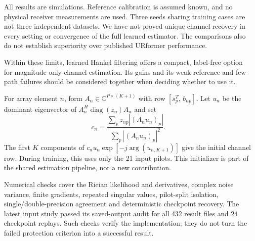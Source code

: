\documentclass[journal]{IEEEtran}
\begin{document}
All results are simulations. Reference calibration is assumed known,
and no physical receiver measurements are used. Three seeds sharing
training cases are not three independent datasets. We have not proved
unique channel recovery in every setting or convergence of the full
learned estimator. The comparisons also do not establish superiority
over published URformer performance.

Within these limits, learned Hankel filtering offers a compact,
label-free option for magnitude-only channel estimation. Its gains and
its weak-reference and few-path failures should be considered together
when deciding whether to use it.

For array element $n$, form $A_n\in\mathbb C^{P\times(K+1)}$ with row
$[s_p^T,\,b_{np}]$. Let $u_n$ be the dominant eigenvector of
$A_n^H\operatorname{diag}(z_n)A_n$ and set
\begin{equation}
 c_n=\frac{\sum_p z_{np}|(A_nu_n)_p|}
 {\sum_p |(A_nu_n)_p|^2}.
\end{equation}
The first $K$ components of
$c_nu_n\exp[-j\arg(u_{n,K+1})]$ give the initial channel row. During
training, this uses only the 21 input pilots. This initializer is part
of the shared estimation pipeline, not a new contribution.

Numerical checks cover the Rician likelihood and derivatives, complex
noise variance, finite gradients, repeated singular values, pilot-split
isolation, single/double-precision agreement and deterministic checkpoint
recovery. The latest input study passed its saved-output audit for all
432 result files and 24 checkpoint replays. Such checks verify the
implementation; they do not turn the failed protection criterion into
a successful result.



\end{document}
